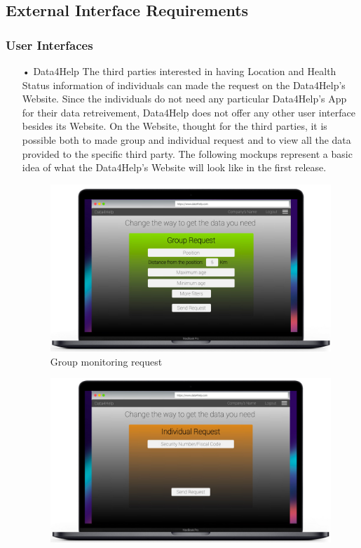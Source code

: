 \subsection{External Interface Requirements}
\subsubsection{User Interfaces}
\begin{enumerate}
\item[•]{\Large Data4Help}
\bigbreak
\noindent
The third parties interested in having Location and Health Status information of individuals can made the request on the Data4Help’s Website. Since the individuals do not need any particular Data4Help’s App for their data retreivement, Data4Help does not offer any other user interface besides its Website. 
On the Website, thought for the third parties, it is possible both to made group and individual request and to view all the data provided to the specific third party.
\bigbreak
\noindent
The following mockups represent a basic idea of what the Data4Help’s Website will look like in the first release.
\\ [2cm]
\begin{figure}[H]
\centering
\includegraphics[scale=0.3]{Images/Mockups/GR.jpg}
\caption{Group monitoring request}
\end{figure}
\begin{figure}
\centering
\includegraphics[scale=0.3]{Images/Mockups/IR.jpg}

\end{figure}
\end{enumerate}
